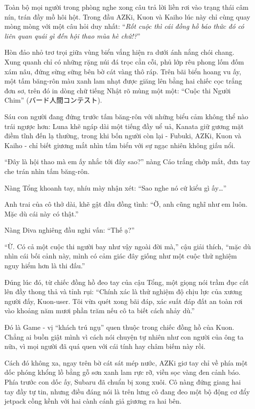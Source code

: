 \documentclass[../main.tex]{subfiles}
\begin{document}
Toàn bộ mọi người trong phòng nghe xong câu trả lời liền rơi vào trạng thái câm nín, trán đầy mồ hôi hột. Trong đầu AZKi, Kuon và Kaiho lúc này chỉ cùng quay mòng mòng với một câu hỏi duy nhất: ``\textit{Rốt cuộc thì cái đồng hồ báo thức đó có liên quan quái gì đến hội thao mùa hè chứ!?}''

\ct

Hòn đảo nhỏ trơ trọi giữa vùng biển vắng hiện ra dưới ánh nắng chói chang. Xung quanh chỉ có những rặng núi đá trọc cằn cỗi, phủ lớp rêu phong lốm đốm xám nâu, đứng sừng sững bên bờ cát vàng thô ráp. Trên bãi biển hoang vu ấy, một tấm băng-rôn màu xanh lam nhạt được giăng lên bằng hai chiếc cọc trắng đơn sơ, trên đó in dòng chữ tiếng Nhật rõ mùng một một: ``Cuộc thi Người Chim'' (バード人間コンテスト).


Sáu con người đang đứng trước tấm băng-rôn với những biểu cảm không thể nào trái ngược hơn: Luna khẽ ngáp dài một tiếng đầy uể uả, Kanata giữ gương mặt điềm tĩnh đến lạ thường, trong khi bốn người còn lại - Fubuki, AZKi, Kuon và Kaiho - chỉ biết giương mắt nhìn tấm biển với sự ngạc nhiên không giấu nổi.

``Đây là hội thao mà em ấy nhắc tới đây sao?'' nàng Cáo trắng chớp mắt, đưa tay che trán nhìn tấm băng-rôn.

Nàng Tổng khoanh tay, nhíu mày nhận xét: ``Sao nghe nó cứ kiểu gì ấy\dots''

Anh trai của cô thở dài, khẽ gật đầu đồng tình: ``Ờ, anh cũng nghĩ như em luôn. Mặc dù cái này có thật.''

Nàng Diva nghiêng đầu nghi vấn: ``Thế ạ?''

``Ừ. Có cả một cuộc thi người bay như vậy ngoài đời mà,'' cậu giải thích, ``mặc dù nhìn cái bối cảnh này, mình có cảm giác đây giống như một cuộc thử nghiệm nguy hiểm hơn là thi đấu.''

Đúng lúc đó, từ chiếc đồng hồ đeo tay của cậu Tổng, một giọng nói trầm đục cất lên đầy thong thả và tỉnh rụi: ``Chính xác là thử nghiệm độ chịu lực của xương người đấy, Kuon-user. Tôi vừa quét xong bãi đáp, xác suất đáp đất an toàn rơi vào khoảng năm mươi phần trăm nếu cô ta biết cách nhảy dù.''

Đó là Game - vị ``khách trú ngụ'' quen thuộc trong chiếc đồng hồ của Kuon. Chẳng ai buồn giật mình vì cách nói chuyện tự nhiên như con người của ông ta nữa, vì mọi người đã quá quen với cái tính hay châm biếm này rồi.

Cách đó không xa, ngay trên bờ cát sát mép nước, AZKi giơ tay chỉ về phía một dốc phóng khổng lồ bằng gỗ sơn xanh lam rực rỡ, viền sọc vàng đen cảnh báo. Phía trước con dốc ấy, Subaru đã chuẩn bị xong xuôi. Cô nàng đứng giang hai tay đầy tự tin, nhưng điều đáng nói là trên lưng cô đang đeo một bộ động cơ đẩy jetpack cồng kềnh với hai cành cánh giả giương ra hai bên.
\end{document}
